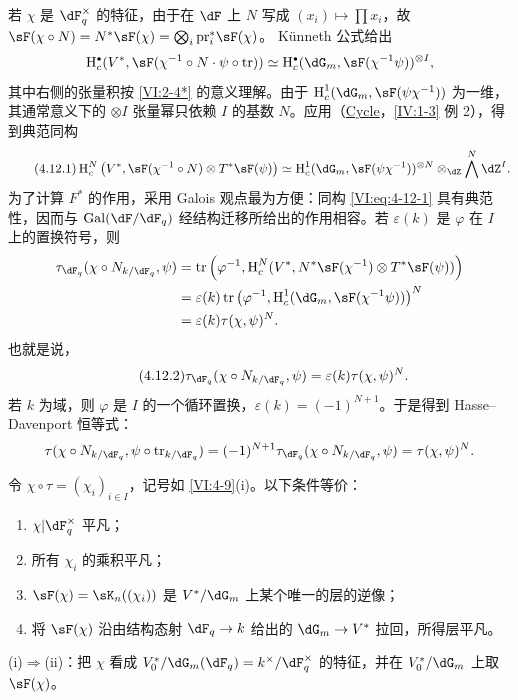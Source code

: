 若 $\chi$ 是 $\dF_q^\times$ 的特征，由于在 $\dF$ 上 $N$ 写成 $(x_i)\mapsto\prod x_i$，故
$\sF(\chi\circ N)=N^\ast\sF(\chi)=\bigotimes_i\pr_i^\ast\sF(\chi)$。
Künneth 公式给出
\[
\h_c^\bullet(V^\ast,\sF(\chi^{-1}\circ N\cdot\psi\circ\tr))
\simeq\h_c^\bullet(\dG_m,\sF(\chi^{-1}\psi))^{\otimes I},
\]
其中右侧的张量积按 \ref{VI:2-4*} 的意义理解。由于 $\h_c^1(\dG_m,\sF(\psi\chi^{-1}))$ 为一维，其通常意义下的 $\otimes I$ 张量幂只依赖 $I$ 的基数 $N$。应用（\hyperref[IV]{Cycle}，\ref{IV:1-3} 例 2），得到典范同构
\begin{equation*}\tag{4.12.1}\label{VI:eq:4-12-1}
\h_c^N\left(V^\ast,\sF(\chi^{-1}\circ N)\otimes T^\ast\sF(\psi)\right)
\simeq\h_c^1(\dG_m,\sF(\psi\chi^{-1}))^{\otimes N}
 \otimes_\dZ\bigwedge^N\dZ^I.
\end{equation*}
为了计算 $F^\ast$ 的作用，采用 Galois 观点最为方便：同构 \eqref{VI:eq:4-12-1} 具有典范性，因而与 $\gal(\dF/\dF_q)$ 经结构迁移所给出的作用相容。若 $\varepsilon(k)$ 是 $\varphi$ 在 $I$ 上的置换符号，则
\begin{align*}
\tau_{\dF_q}(\chi\circ N_{k/\dF_q},\psi)
&=\tr\left(\varphi^{-1},\h_c^N(V^\ast,N^\ast\sF(\chi^{-1})\otimes T^\ast\sF(\psi))\right)\\
&=\varepsilon(k)\tr\left(\varphi^{-1},\h_c^1(\dG_m,\sF(\chi^{-1}\psi))\right)^N\\
&=\varepsilon(k)\tau(\chi,\psi)^N.
\end{align*}
也就是说，
\begin{equation*}\tag{4.12.2}\label{VI:eq:4-12-2}
\tau_{\dF_q}(\chi\circ N_{k/\dF_q},\psi)=\varepsilon(k)\tau(\chi,\psi)^N.
\end{equation*}
若 $k$ 为域，则 $\varphi$ 是 $I$ 的一个循环置换，$\varepsilon(k)=(-1)^{N+1}$。于是得到 Hasse--Davenport 恒等式：
\[
\tau(\chi\circ N_{k/\dF_q},\psi\circ\tr_{k/\dF_q})
=(-1)^{N+1}\tau_{\dF_q}(\chi\circ N_{k/\dF_q},\psi)=\tau(\chi,\psi)^N.
\]

\begin{lemma_}\label{VI:4-13}
令 $\chi\circ\tau=(\chi_i)_{i\in I}$，记号如 \ref{VI:4-9}(i)。以下条件等价：
\begin{enumerate}[\indent (i)]
\item $\chi|\dF_q^\times$ 平凡；
\item 所有 $\chi_i$ 的乘积平凡；
\item $\sF(\chi)=\sK_n((\chi_i))$ 是 $V^\ast/\dG_m$ 上某个唯一的层的逆像；
\item 将 $\sF(\chi)$ 沿由结构态射 $\dF_q\to k$ 给出的 $\dG_m\to V^\ast$ 拉回，所得层平凡。
\end{enumerate}
\end{lemma_}
(i)$\Rightarrow$(ii)：把 $\chi$ 看成 $V_0^\ast/\dG_m(\dF_q)=k^\times/\dF_q^\times$ 的特征，并在 $V_0^\ast/\dG_m$ 上取 $\sF(\chi)$。

